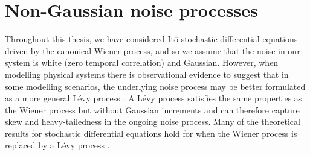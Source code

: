 



\section{Non-Gaussian noise processes}\label{sec:disc_levy}
Throughout this thesis, we have considered It\^o stochastic differential equations driven by the canonical Wiener process, and so we assume that the noise in our system is white (zero temporal correlation) and Gaussian.
However, when modelling physical systems there is observational evidence to suggest that in some modelling scenarios, the underlying noise process may be better formulated as a more general L\'evy process \citep{Ditlevsen_1999_ObservationAstableNoise, Viecelli_1998_PossibilitySingularLowFrequency}.
A L\'evy process satisfies the same properties as the Wiener process but without Gaussian increments and can therefore capture skew and heavy-tailedness in the ongoing noise process.
Many of the theoretical results for stochastic differential equations hold for when the Wiener process is replaced by a L\'evy process \citep{Applebaum_2004_LevyProcessesStochastic}.

